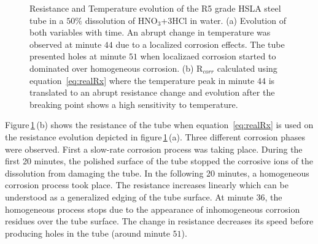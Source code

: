 \documentclass[journal,twoside,web]{ieeecolor}
\begin{document}
\begin{figure}[!t]
\centering
{}
\caption{Resistance and Temperature evolution of the R5 grade HSLA steel tube in a $50\%$ dissolution of HNO$_{3}$+$3$HCl in water. (a) Evolution of both variables with time. An abrupt change in temperature was observed at minute $44$ due to a localized corrosion effects. The tube presented holes at minute $51$ when localizaed corrosion started to dominated over homogeneous corrosion. (b) R$_{corr}$ calculated using equation~\ref{eq:realRx} where the temperature peak in minute $44$ is translated to an abrupt resistance change and evolution after the breaking point shows a high sensitivity to temperature.}
\label{fig:aqRegiaResults}
\end{figure} 

Figure\,\ref{fig:aqRegiaResults}\,(b) shows the resistance of the tube when equation~\ref{eq:realRx} is used on the resistance evolution depicted in figure\,\ref{fig:aqRegiaResults}\,(a). Three different corrosion phases were observed. First a slow-rate corrosion process was taking place. During the first 20 minutes, the polished surface of the tube stopped the corrosive ions of the dissolution from damaging the tube. In the following 20 minutes, a homogeneous corrosion process took place. The resistance increases linearly which can be understood as a generalized edging of the tube surface. At minute 36, the homogeneous process stops due to the appearance of inhomogeneous corrosion residues over the tube surface. The change in resistance decreases its speed before producing holes in the tube (around minute $51$).
\end{document}
